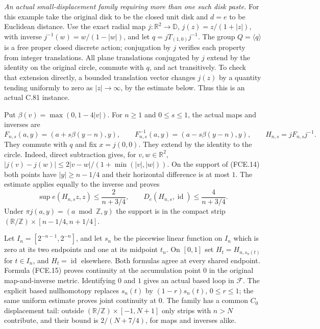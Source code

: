 \documentclass[11pt,a4paper]{article}
\DeclareMathOperator{\id}{id}\DeclareMathOperator{\im}{im}
\begin{document}
\emph{An actual small-displacement family requiring more than one such disk paste.}
For this example take the original disk to be the closed
unit disk and $d=e$ to be Euclidean distance. Use the exact
radial map
$j:\mathbb R^2\to\mathbb D$, $j(z)=z/(1+|z|)$, with
inverse $j^{-1}(w)=w/(1-|w|)$, and let
$q=jT_{(1,0)}j^{-1}$. The group $Q=\langle q\rangle$
is a free proper closed discrete action; conjugation by
$j$ verifies each property from integer translations.
All plane translations conjugated by $j$ extend by the
identity on the original circle, commute with $q$, and
act transitively. To check that extension directly, a
bounded translation vector changes $j(z)$ by a quantity
tending uniformly to zero as $|z|\to\infty$, by the
estimate below. Thus this is an actual C.81 instance.

Put $\beta(v)=\max(0,1-4|v|)$. For $n\geq1$ and
$0\leq s\leq1$, the actual maps and inverses are
\[
 F_{n,s}(a,y)=(a+s\beta(y-n),y),\qquad
 F_{n,s}^{-1}(a,y)=(a-s\beta(y-n),y),\qquad
 H_{n,s}=jF_{n,s}j^{-1}.
                                                               \tag{FCE.14}
\]
They commute with $q$ and fix $x=j(0,0)$. They extend by
the identity to the circle. Indeed, direct subtraction
gives, for $v,w\in\mathbb R^2$,
$|j(v)-j(w)|\leq
2|v-w|/(1+\min(|v|,|w|))$.
On the support of (FCE.14) both points have
$|y|\geq n-1/4$ and their horizontal difference is at most $1$.
The estimate applies equally to the inverse and proves
\[
 \sup e(H_{n,s}z,z)\leq\frac{2}{n+3/4},\qquad
 D_e(H_{n,s},\id)\leq\frac{4}{n+3/4}.
                                                               \tag{FCE.15}
\]
Under $\pi j(a,y)=(a\bmod\mathbb Z,y)$ the support is
in the compact strip
$(\mathbb R/\mathbb Z)\times[n-1/4,n+1/4]$.

Let $I_n=[2^{-n-1},2^{-n}]$, and let $s_n$ be the
piecewise linear function on $I_n$ which is zero at its
two endpoints and one at its midpoint $t_n$.
On $[0,1]$ set $H_t=H_{n,s_n(t)}$ for $t\in I_n$,
and $H_t=\id$ elsewhere. Both formulas agree at every
shared endpoint. Formula (FCE.15) proves continuity at
the accumulation point $0$ in the original map-and-inverse
metric. Identifying $0$ and $1$ gives an actual based loop in
$\mathscr F$. The explicit based nullhomotopy replaces
$s_n(t)$ by $(1-r)s_n(t)$, $0\leq r\leq1$; the same
uniform estimate proves joint continuity at $0$.
The family has a common $C_0$ displacement tail: outside
$(\mathbb R/\mathbb Z)\times[-1,N+1]$ only strips with
$n>N$ contribute, and their bound is
$2/(N+7/4)$, for maps and inverses alike.
\end{document}
